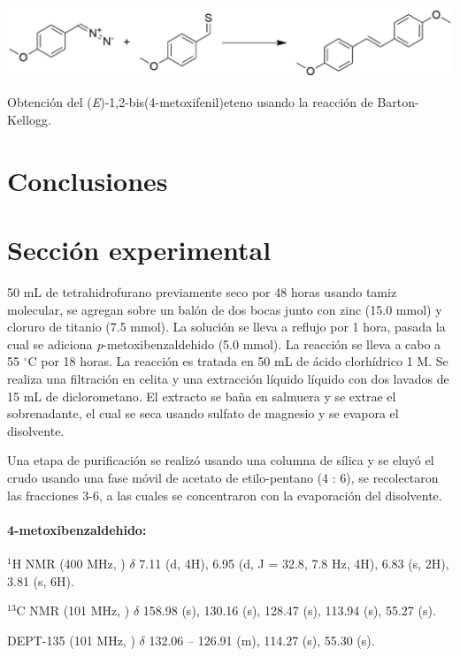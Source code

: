 \documentclass[fleqn,11pt]{SelfArx}
\begin{document}
\begin{scheme}[h]
	\centering
	\includegraphics[width=\linewidth]{structures/Barton.png}
	\caption{Obtenci\'on del (\textit{E})-1,2-bis(4-metoxifenil)eteno usando la reacci\'on de Barton-Kellogg.}
\end{scheme}

\section{Conclusiones}
\section{Secci\'on experimental}
50 mL de tetrahidrofurano previamente seco por 48 horas usando tamiz molecular, se agregan sobre un bal\'on de dos bocas junto con zinc (15.0 mmol) y cloruro de titanio (7.5 mmol). La soluci\'on se lleva a reflujo por 1 hora, pasada la cual se adiciona \textit{p}-metoxibenzaldehido (5.0 mmol). La reacci\'on se lleva a cabo a 55 $^\circ$C por 18 horas. La reacci\'on es tratada en 50 mL de \'acido clorh\'idrico 1 M. Se realiza una filtraci\'on en celita y una extracci\'on l\'iquido l\'iquido con dos lavados de 15 mL de diclorometano. El extracto se baña en salmuera y se extrae el sobrenadante, el cual se seca usando sulfato de magnesio y se evapora el disolvente.

Una etapa de purificaci\'on se realizó usando una columna de s\'ilica y se eluy\'o el crudo usando una fase m\'ovil de acetato de etilo-pentano (4 : 6), se recolectaron las fracciones 3-6, a las cuales se concentraron con la evaporaci\'on del disolvente.

\paragraph{4-metoxibenzaldehido:}
$^1$H NMR (400 MHz, ) $\delta$ 7.11 (d, 4H), 6.95 (d, J = 32.8, 7.8 Hz, 4H), 6.83 (s, 2H), 3.81 (s, 6H).

$^{13}$C NMR (101 MHz, ) $\delta$ 158.98 (s), 130.16 (s), 128.47 (s), 113.94 (s), 55.27 (s).

DEPT-135 (101 MHz, ) $\delta$ 132.06 – 126.91 (m), 114.27 (s), 55.30 (s).


\newpage
\onecolumn
\end{document}
